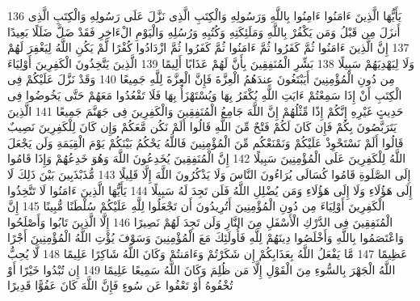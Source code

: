 \documentclass[20pt,a4paper]{article}
\begin{document}
{\tiny\colorbox{cl_aya}{136}} يَأَيُّهَا الَّذِينَ ءَامَنُوا ءَامِنُوا بِاللَّهِ وَرَسُولِهِ وَالْكِتَبِ الَّذِى نَزَّلَ عَلَى رَسُولِهِ وَالْكِتَبِ الَّذِى أَنزَلَ مِن قَبْلُ وَمَن يَكْفُرْ بِاللَّهِ وَمَلَئِكَتِهِ وَكُتُبِهِ وَرُسُلِهِ وَالْيَوْمِ الْءَاخِرِ فَقَدْ ضَلَّ ضَلَلًا بَعِيدًا
{\tiny\colorbox{cl_aya}{137}} إِنَّ الَّذِينَ ءَامَنُوا ثُمَّ كَفَرُوا ثُمَّ ءَامَنُوا ثُمَّ كَفَرُوا ثُمَّ ازْدَادُوا كُفْرًا لَّمْ يَكُنِ اللَّهُ لِيَغْفِرَ لَهُمْ وَلَا لِيَهْدِيَهُمْ سَبِيلًا
{\tiny\colorbox{cl_aya}{138}} بَشِّرِ الْمُنَفِقِينَ بِأَنَّ لَهُمْ عَذَابًا أَلِيمًا
{\tiny\colorbox{cl_aya}{139}} الَّذِينَ يَتَّخِذُونَ الْكَفِرِينَ أَوْلِيَاءَ مِن دُونِ الْمُؤْمِنِينَ أَيَبْتَغُونَ عِندَهُمُ الْعِزَّةَ فَإِنَّ الْعِزَّةَ لِلَّهِ جَمِيعًا
{\tiny\colorbox{cl_aya}{140}} وَقَدْ نَزَّلَ عَلَيْكُمْ فِى الْكِتَبِ أَنْ إِذَا سَمِعْتُمْ ءَايَتِ اللَّهِ يُكْفَرُ بِهَا وَيُسْتَهْزَأُ بِهَا فَلَا تَقْعُدُوا مَعَهُمْ حَتَّى يَخُوضُوا فِى حَدِيثٍ غَيْرِهِ إِنَّكُمْ إِذًا مِّثْلُهُمْ إِنَّ اللَّهَ جَامِعُ الْمُنَفِقِينَ وَالْكَفِرِينَ فِى جَهَنَّمَ جَمِيعًا
{\tiny\colorbox{cl_aya}{141}} الَّذِينَ يَتَرَبَّصُونَ بِكُمْ فَإِن كَانَ لَكُمْ فَتْحٌ مِّنَ اللَّهِ قَالُوا أَلَمْ نَكُن مَّعَكُمْ وَإِن كَانَ لِلْكَفِرِينَ نَصِيبٌ قَالُوا أَلَمْ نَسْتَحْوِذْ عَلَيْكُمْ وَنَمْنَعْكُم مِّنَ الْمُؤْمِنِينَ فَاللَّهُ يَحْكُمُ بَيْنَكُمْ يَوْمَ الْقِيَمَةِ وَلَن يَجْعَلَ اللَّهُ لِلْكَفِرِينَ عَلَى الْمُؤْمِنِينَ سَبِيلًا
{\tiny\colorbox{cl_aya}{142}} إِنَّ الْمُنَفِقِينَ يُخَدِعُونَ اللَّهَ وَهُوَ خَدِعُهُمْ وَإِذَا قَامُوا إِلَى الصَّلَوةِ قَامُوا كُسَالَى يُرَاءُونَ النَّاسَ وَلَا يَذْكُرُونَ اللَّهَ إِلَّا قَلِيلًا
{\tiny\colorbox{cl_aya}{143}} مُّذَبْذَبِينَ بَيْنَ ذَلِكَ لَا إِلَى هَؤُلَاءِ وَلَا إِلَى هَؤُلَاءِ وَمَن يُضْلِلِ اللَّهُ فَلَن تَجِدَ لَهُ سَبِيلًا
{\tiny\colorbox{cl_aya}{144}} يَأَيُّهَا الَّذِينَ ءَامَنُوا لَا تَتَّخِذُوا الْكَفِرِينَ أَوْلِيَاءَ مِن دُونِ الْمُؤْمِنِينَ أَتُرِيدُونَ أَن تَجْعَلُوا لِلَّهِ عَلَيْكُمْ سُلْطَنًا مُّبِينًا
{\tiny\colorbox{cl_aya}{145}} إِنَّ الْمُنَفِقِينَ فِى الدَّرْكِ الْأَسْفَلِ مِنَ النَّارِ وَلَن تَجِدَ لَهُمْ نَصِيرًا
{\tiny\colorbox{cl_aya}{146}} إِلَّا الَّذِينَ تَابُوا وَأَصْلَحُوا وَاعْتَصَمُوا بِاللَّهِ وَأَخْلَصُوا دِينَهُمْ لِلَّهِ فَأُولَئِكَ مَعَ الْمُؤْمِنِينَ وَسَوْفَ يُؤْتِ اللَّهُ الْمُؤْمِنِينَ أَجْرًا عَظِيمًا
{\tiny\colorbox{cl_aya}{147}} مَّا يَفْعَلُ اللَّهُ بِعَذَابِكُمْ إِن شَكَرْتُمْ وَءَامَنتُمْ وَكَانَ اللَّهُ شَاكِرًا عَلِيمًا
{\tiny\colorbox{cl_aya}{148}} لَّا يُحِبُّ اللَّهُ الْجَهْرَ بِالسُّوءِ مِنَ الْقَوْلِ إِلَّا مَن ظُلِمَ وَكَانَ اللَّهُ سَمِيعًا عَلِيمًا
{\tiny\colorbox{cl_aya}{149}} إِن تُبْدُوا خَيْرًا أَوْ تُخْفُوهُ أَوْ تَعْفُوا عَن سُوءٍ فَإِنَّ اللَّهَ كَانَ عَفُوًّا قَدِيرًا
\end{document}
